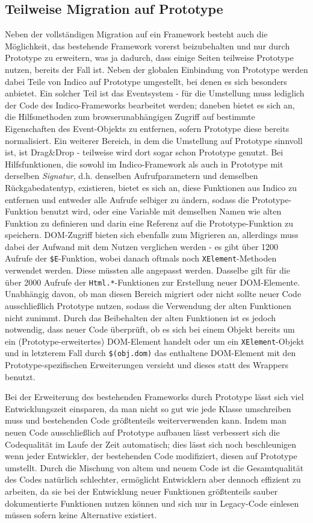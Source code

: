 \subsection{Teilweise Migration auf Prototype}
Neben der vollständigen Migration auf ein Framework besteht auch die Möglichkeit, das bestehende
Framework vorerst beizubehalten und nur durch Prototype zu erweitern, was ja dadurch, dass einige
Seiten teilweise Prototype nutzen, bereits der Fall ist. Neben der globalen Einbindung von Prototype
werden dabei Teile von Indico auf Prototype umgestellt, bei denen es sich besonders anbietet. Ein
solcher Teil ist das Eventsystem - für die Umstellung muss lediglich der Code des Indico-Frameworks
bearbeitet werden; daneben bietet es sich an, die Hilfsmethoden zum browserunabhängigen Zugriff auf
bestimmte Eigenschaften des Event-Objekts zu entfernen, sofern Prototype diese bereits normalisiert.
Ein weiterer Bereich, in dem die Umstellung auf Prototype sinnvoll ist, ist Drag\&Drop - teilweise
wird dort sogar schon Prototype genutzt. Bei Hilfsfunktionen, die sowohl im Indico-Framework als
auch in Prototype mit derselben \emph{Signatur}, d.h. denselben Aufrufparametern und demselben
Rückgabedatentyp, existieren, bietet es sich an, diese Funktionen aus Indico zu entfernen und
entweder alle Aufrufe selbiger zu ändern, sodass die Prototype-Funktion benutzt wird, oder eine
Variable mit demselben Namen wie alten Funktion zu definieren und darin eine Referenz auf die
Prototype-Funktion zu speichern. DOM-Zugriff bieten sich ebenfalls zum Migrieren an, allerdings muss
dabei der Aufwand mit dem Nutzen verglichen werden - es gibt über 1200 Aufrufe der
\lstinline{$E}-Funktion, wobei danach oftmals noch \lstinline{XElement}-Methoden verwendet werden.
Diese müssten alle angepasst werden. Dasselbe gilt für die über 2000 Aufrufe der
\lstinline{Html.*}-Funktionen zur Erstellung neuer DOM-Elemente. Unabhängig davon, ob man diesen
Bereich migriert oder nicht sollte neuer Code ausschließlich Prototype nutzen, sodass die Verwendung
der alten Funktionen nicht zunimmt. Durch das Beibehalten der alten Funktionen ist es jedoch
notwendig, dass neuer Code überprüft, ob es sich bei einem Objekt bereits um ein
(Prototype-erweitertes) DOM-Element handelt oder um ein \lstinline{XElement}-Objekt und in letzterem
Fall durch \lstinline{$(obj.dom)} das enthaltene DOM-Element mit den Prototype-spezifischen
Erweiterungen versieht und dieses statt des Wrappers benutzt.

Bei der Erweiterung des bestehenden Frameworks durch Prototype lässt sich viel Entwicklungszeit
einsparen, da man nicht so gut wie jede Klasse umschreiben muss und bestehenden Code größtenteils
weiterverwenden kann. Indem man neuen Code ausschließlich auf Prototype aufbauen lässt verbessert
sich die Codequalität im Laufe der Zeit automatisch; dies lässt sich noch beschleunigen wenn jeder
Entwickler, der bestehenden Code modifiziert, diesen auf Prototype umstellt. Durch die Mischung von
altem und neuem Code ist die Gesamtqualität des Codes natürlich schlechter, ermöglicht Entwicklern
aber dennoch effizient zu arbeiten, da sie bei der Entwicklung neuer Funktionen größtenteils sauber
dokumentierte Funktionen nutzen können und sich nur in Legacy-Code einlesen müssen sofern keine
Alternative existiert.


